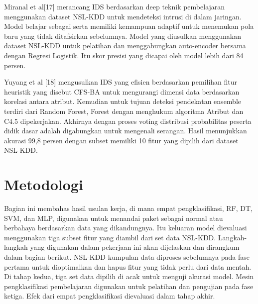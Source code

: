 \documentclass[conference]{IEEEtran}
\begin{document}
Miranal et al[17]\cite{gurung2019deep} merancang IDS berdasarkan deep teknik pembelajaran menggunakan dataset NSL-KDD untuk mendeteksi intrusi di dalam jaringan. Model belajar sebagai serta memiliki kemampuan adaptif untuk menemukan pola baru yang tidak ditafsirkan sebelumnya. Model yang diusulkan menggunakan dataset NSL-KDD untuk pelatihan dan menggabungkan auto-encoder bersama dengan Regresi Logistik. Itu skor presisi yang dicapai oleh model lebih dari 84 persen. 

Yuyang et al [18]\cite{zhou174building} mengusulkan IDS yang efisien berdasarkan pemilihan fitur heuristik yang disebut CFS-BA untuk mengurangi dimensi data berdasarkan korelasi antara atribut. Kemudian untuk tujuan deteksi pendekatan ensemble terdiri dari Random Forest, Forest dengan menghukum algoritma Atribut dan C4.5 dipekerjakan. Akhirnya dengan proses voting distribusi probabilitas peserta didik dasar adalah digabungkan untuk mengenali serangan. Hasil menunjukkan akurasi 99,8 persen dengan subset memiliki 10 fitur yang dipilih dari dataset NSL-KDD.

\section{Metodologi}

Bagian ini membahas hasil usulan kerja, di mana empat pengklasifikasi, RF, DT, SVM, dan MLP, digunakan untuk menandai paket sebagai normal atau berbahaya berdasarkan data yang dikandungnya. Itu keluaran model dievaluasi menggunakan tiga subset fitur yang diambil dari set data NSL-KDD. Langkah-langkah yang digunakan dalam pekerjaan ini akan dijelaskan dan dirangkum dalam bagian berikut. NSL-KDD kumpulan data diproses sebelumnya pada fase pertama untuk dioptimalkan dan hapus fitur yang tidak perlu dari data mentah. Di tahap kedua, tiga set data dipilih di acak untuk menguji akurasi model. Mesin pengklasifikasi pembelajaran digunakan untuk pelatihan dan pengujian pada fase ketiga. Efek dari empat pengklasifikasi dievaluasi dalam tahap akhir.
\end{document}
